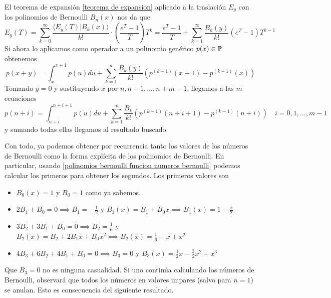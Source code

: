 \begin{demo}
    El teorema de expansión \ref{teorema de expansion} aplicado a la traslación $E_y$ con los polinomios de Bernoulli $B_n(x)$ nos da que
    \begin{equation*}
        E_y(T) = \sum_{k=0}^\infty \frac{\langle E_y(T)| B_k(x) \rangle}{k!} \cdot \left(\frac{e^T - 1}{T}\right) T^k = \frac{e^T - 1}{T} + \sum_{k=1}^\infty \frac{B_k(y)}{k!} (e^T - 1) T^{k-1} 
    \end{equation*}
    Si ahora lo aplicamos como operador a un polinomio genérico $p(x) \in \mathbb{P}$ obtenemos
    \begin{equation*}
        p(x+y) = \int_{x}^{x+1} p(u)du + \sum_{k=1}^\infty \frac{B_k(y)}{k!} \left(p^{(k-1)}(x+1) - p^{(k-1)}(x)\right)
    \end{equation*}
    Tomando $y = 0$ y sustituyendo $x$ por $n, n + 1, \dots, n + m -1$, llegamos a las $m$ ecuaciones
    \begin{equation*}
        p(n + i) = \int_{n+i}^{n + i + 1} p(u)du + \sum_{k=1}^\infty \frac{B_k}{k!} \left(p^{(k-1)}(n + i + 1) - p^{(k-1)}(n + i)\right) \quad i = 0, 1, \dots, m-1
    \end{equation*}
    y sumando todas ellas llegamos al resultado buscado.
\end{demo}

Con todo, ya podemos obtener por recurrencia tanto los valores de los números de Bernoulli como la forma explícita de los polinomios de Bernoulli. En particular, usando \eqref{polinomios bernoulli funcion numeros bernoulli} podemos calcular los primeros para obtener los segundos. Los primeros valores son
\begin{itemize}
    \item $B_0(x) = 1$ y $B_0 = 1$ como ya sabemos.
    \item $2B_1 + B_0 = 0 \implies B_1 = -\frac{1}{2}$ y $B_1(x) = B_1 + B_0 x \implies B_1(x) = 1 - \frac{x}{2}$
    \item $3B_2 + 3B_1 + B_0 = 0 \implies B_2 = \frac{1}{6}$ y $B_2(x) = B_2 + 2B_1 x + B_0 x^2 \implies B_2(x) = \frac{1}{6} - x + x^2$
    \item $4B_3 + 6B_2 + 4B_1 + B_0 = 0 \implies B_3 = 0$ y $B_3(x) = \frac{1}{2}x - \frac{3}{2}x^2 + x^3$
\end{itemize}
Que $B_3 = 0$ no es ninguna casualidad. Si uno continúa calculando los números de Bernoulli, observará que todos los números en valores impares (salvo para $n=1$) se anulan. Esto es consecuencia del siguiente resultado.


